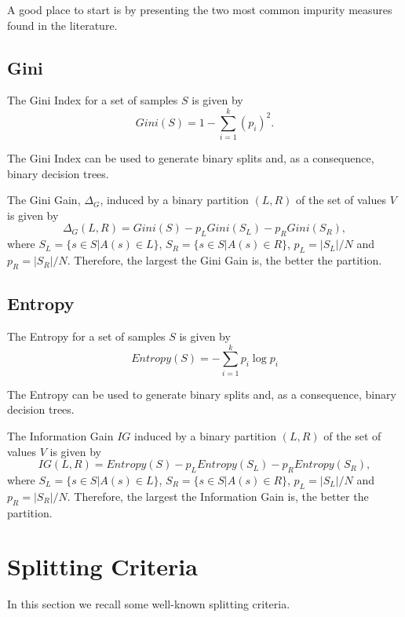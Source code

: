 A good place to start is by presenting the two most common impurity measures found in the literature.

\subsection{Gini}
The Gini Index for a set of samples $S$ is given by 
\begin{equation}
 Gini(S) =  1- \sum_{i=1}^k (p_i)^2 .
\label{eq:gini}
\end{equation}

The Gini Index can be used to generate binary splits
and, as a consequence, binary decision trees.

The Gini Gain, $\Delta_G$, induced by a binary partition $(L,R)$ 
of the set of values $V$ is
given by 
\begin{equation}
 \Delta_G (L,R) = Gini(S) -
p_L Gini(S_L) - p_R Gini(S_R),
\label{eq:Ginigain}
\end{equation}
where $S_L= \{ s \in S | A(s) \in L \}$, $S_R= \{ s \in S | A(s) \in R \}$,
 $p_L=|S_L| /N $
and $p_R=|S_R| /N$. Therefore, the largest the Gini Gain is, the better the partition.

\subsection{Entropy}
The Entropy for a set of samples $S$ is given by 
\begin{equation}
 Entropy(S) =  - \sum_{i=1}^k p_i \log p_i
\label{eq:entropy}
\end{equation}

The Entropy can be used to generate binary splits
and, as a consequence, binary decision trees.

The Information Gain $IG$ induced by a binary partition $(L,R)$ 
of the set of values $V$ is given by 
\begin{equation}
 IG(L,R) = Entropy(S) -
p_L Entropy(S_L) - p_R Entropy(S_R),
\label{eq:InformationGain}
\end{equation}
where $S_L= \{ s \in S | A(s) \in L \}$, $S_R= \{ s \in S | A(s) \in R \}$,
 $p_L=|S_L| /N $ and $p_R=|S_R| /N$. Therefore, the largest the Information Gain is, the better the partition.


\section{Splitting Criteria}
In this section we recall some well-known splitting criteria.

